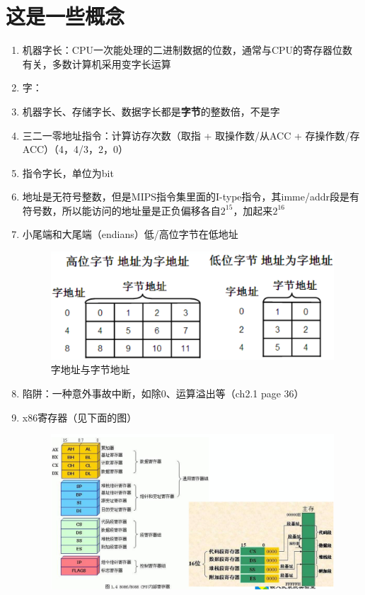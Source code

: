 \documentclass[]{report}
\begin{document}
	\section{这是一些概念}
	\begin{enumerate}
		\item 机器字长：CPU一次能处理的二进制数据的位数，通常与CPU的寄存器位数有关，多数计算机采用变字长运算
		\item 字：
		\item 机器字长、存储字长、数据字长都是\textbf{字节}的整数倍，不是字
		\item 三二一零地址指令：计算访存次数（取指 + 取操作数/从ACC + 存操作数/存ACC）（4，4/3，2，0）
		\item 指令字长，单位为bit
		\item 地址是无符号整数，但是MIPS指令集里面的I-type指令，其imme/addr段是有符号数，所以能访问的地址量是正负偏移各自$2^15$，加起来$2^16$
		\item 小尾端和大尾端（endians）低/高位字节在低地址
		\begin{figure}[h]
			\centering
			\begin{minipage}{40em}
				\centering
				\includegraphics[scale = 0.3]{images/Endians.png}
				\caption{字地址与字节地址}
			\end{minipage}
		\end{figure}
		\item 陷阱：一种意外事故中断，如除0、运算溢出等（ch2.1 page 36）
		\item x86寄存器（见下面的图）
		\begin{figure}[h!]
			\centering
			\begin{minipage}{40em}
				\centering
				\includegraphics[scale = 0.22]{images/x86.png}

\end{minipage}
\end{figure}
\end{enumerate}
\end{document}
